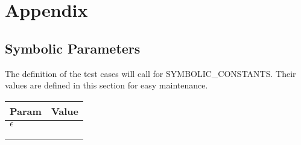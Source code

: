 \documentclass[12pt, titlepage]{article}
\begin{document}
\newpage

\section{Appendix}


\subsection{Symbolic Parameters}

The definition of the test cases will call for SYMBOLIC\_CONSTANTS. Their values are defined in this
section for easy maintenance.

\begin{table}[h]
    \centering
    \begin{tabular}{|l|l|}
    \hline
    \textbf{Param} & \textbf{Value} \\ \hline
              $\epsilon$     &                \\ \hline
                   &                \\ \hline
                   &                \\ \hline
                   &                \\ \hline
    \end{tabular}
    \end{table}




\end{document}
